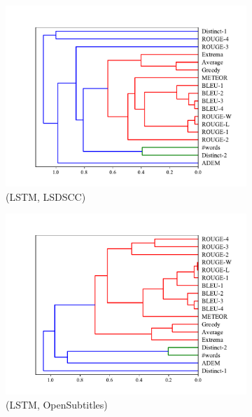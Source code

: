 \begin{figure}[htb]
\begin{subfigure}{0.33\linewidth}
        \includegraphics[width=\linewidth]{figure/plot/hierarchy/v2/pearson/lstm/lsdscc/plot.pdf}
        \caption{(LSTM, LSDSCC)}
    \end{subfigure}%
    \begin{subfigure}{0.33\linewidth}
        \centering
        \includegraphics[width=\linewidth]{figure/plot/hierarchy/v2/pearson/lstm/opensub/plot.pdf}
        \caption{(LSTM, OpenSubtitles)}
    \end{subfigure}%
    \begin{subfigure}{0.33\linewidth}
        \centering

\end{subfigure}
\end{figure}
